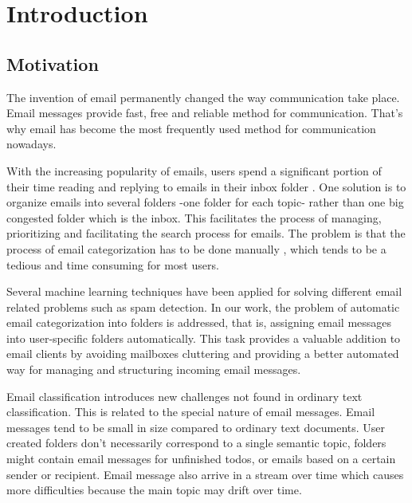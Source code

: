 
\chapter{Introduction} %

\label{Chapter1} %


\section{Motivation}

The invention of email permanently changed the way communication take place. Email messages provide fast, free and reliable method for communication. That's why email has become the most frequently used method for communication nowadays.

With the increasing popularity of emails, users spend a significant portion of their time reading and replying to emails in their inbox folder . One solution is to organize emails into several folders -one folder for each topic- rather than one big congested folder which is the inbox. This facilitates the process of managing, prioritizing and facilitating the search process for emails. The problem is that the process of email categorization has to be done manually , which tends to be a tedious and time consuming for most users.

Several machine learning techniques have been applied for solving different email related problems such as spam detection. In our work, the problem of automatic email categorization into folders is addressed, that is, assigning email messages into user-specific folders automatically. This task provides a valuable addition to email clients by avoiding mailboxes cluttering and providing a better automated way for managing and structuring incoming email messages.

	Email classification introduces new challenges not found in ordinary text classification. This is related to the special nature of email messages. Email messages tend to be small in size compared to ordinary text documents. User created folders don’t necessarily correspond to a single semantic topic, folders might contain email messages for unfinished todos, or emails based on a certain sender or recipient. Email message also arrive in a stream over time which causes more difficulties because the main topic may drift over time.

